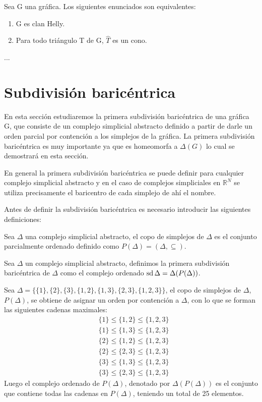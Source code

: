  
\begin{Teo}
Sea G una gráfica. Los siguientes enunciados son equivalentes:
\begin{enumerate}
\item G es clan Helly.
\item Para todo triángulo T de G, $\hat{T}$ es un cono.
\end{enumerate}
\end{Teo}
\begin{Dem}
...
\end{Dem}
\section{Subdivisión baricéntrica}
En esta sección estudiaremos la primera subdivisión baricéntrica de una gráfica G, que consiste de un complejo simplicial abstracto definido a partir de darle un orden parcial por contención a los simplejos de la gráfica. La primera subdivisión baricéntrica es muy importante ya que es homeomorfa a $\Delta(G)$ lo cual se demostrará en esta sección.

En general la primera subdivisión baricéntrica se puede definir para cualquier complejo simplicial abstracto y en el caso de complejos simpliciales en $\mathbb{R}^N$ se utiliza precisamente el baricentro de cada simplejo de ahí el nombre.

Antes de definir la subdivisión baricéntrica es necesario introducir las siguientes definiciones:

\begin{Defi}
Sea $\Delta$ una complejo simplicial abstracto, el copo de simplejos de $\Delta$ es el conjunto parcialmente ordenado definido como $P(\Delta) = (\Delta,\subseteq)$. 
\end{Defi}

\begin{Defi}
Sea $\Delta$ un complejo simplicial abstracto, definimos la primera subdivisión baricéntrica de $\Delta$ como el complejo ordenado $\operatorname{sd}\Delta = \Delta(P(\Delta))$.
\end{Defi}
\begin{Ejem}
Sea $\Delta = \{\{1\},\{2\},\{3\},\{1,2\},\{1,3\},\{2,3\},\{1,2,3\}\}$, el copo de simplejos de $\Delta$, $P(\Delta)$, se obtiene de asignar un orden por contención a $\Delta$, con lo que se forman las siguientes cadenas maximales:
\begin{align*}
&\{1\}\leq\{1,2\}\leq\{1,2,3\}\\
&\{1\}\leq\{1,3\}\leq\{1,2,3\}\\
&\{2\}\leq\{1,2\}\leq\{1,2,3\}\\
&\{2\}\leq\{2,3\}\leq\{1,2,3\}\\
&\{3\}\leq\{1,3\}\leq\{1,2,3\}\\
&\{3\}\leq\{2,3\}\leq\{1,2,3\}
\end{align*}
Luego el complejo ordenado de $P(\Delta)$, denotado por $\Delta(P(\Delta))$ es el conjunto que contiene todas las cadenas en $P(\Delta)$, teniendo un total de 25 elementos.
\end{Ejem}



